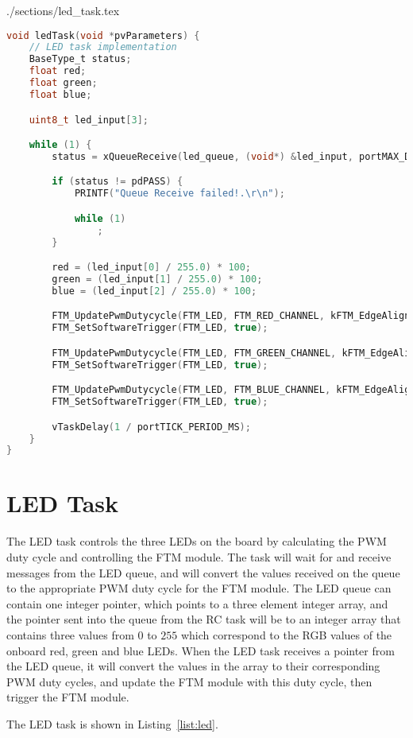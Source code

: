 \begin{filecontents}[overwrite]{./sections/led_task.tex}
\begin{lstlisting}[language=c,caption=LED Task, label=list:led]
void ledTask(void *pvParameters) {
    // LED task implementation
    BaseType_t status;
    float red;
    float green;
    float blue;

    uint8_t led_input[3];

    while (1) {
        status = xQueueReceive(led_queue, (void*) &led_input, portMAX_DELAY);

        if (status != pdPASS) {
            PRINTF("Queue Receive failed!.\r\n");

            while (1)
                ;
        }

        red = (led_input[0] / 255.0) * 100;
        green = (led_input[1] / 255.0) * 100;
        blue = (led_input[2] / 255.0) * 100;

        FTM_UpdatePwmDutycycle(FTM_LED, FTM_RED_CHANNEL, kFTM_EdgeAlignedPwm, (uint8_t) red);
        FTM_SetSoftwareTrigger(FTM_LED, true);

        FTM_UpdatePwmDutycycle(FTM_LED, FTM_GREEN_CHANNEL, kFTM_EdgeAlignedPwm, (uint8_t) green);
        FTM_SetSoftwareTrigger(FTM_LED, true);

        FTM_UpdatePwmDutycycle(FTM_LED, FTM_BLUE_CHANNEL, kFTM_EdgeAlignedPwm, (uint8_t) blue);
        FTM_SetSoftwareTrigger(FTM_LED, true);

        vTaskDelay(1 / portTICK_PERIOD_MS);
    }
}
\end{lstlisting}
\end{filecontents}

\section*{LED Task}

The LED task controls the three LEDs on the board by calculating the PWM duty cycle and controlling the FTM module. The task will wait for and receive messages from the LED queue, and will convert the values received on the queue to the appropriate PWM duty cycle for the FTM module. The LED queue can contain one integer pointer, which points to a three element integer array, and the pointer sent into the queue from the RC task will be to an integer array that contains three values from $0$ to $255$ which correspond to the RGB values of the onboard red, green and blue LEDs. When the LED task receives a pointer from the LED queue, it will convert the values in the array to their corresponding PWM duty cycles, and update the FTM module with this duty cycle, then trigger the FTM module.

The LED task is shown in Listing~\ref{list:led}.


